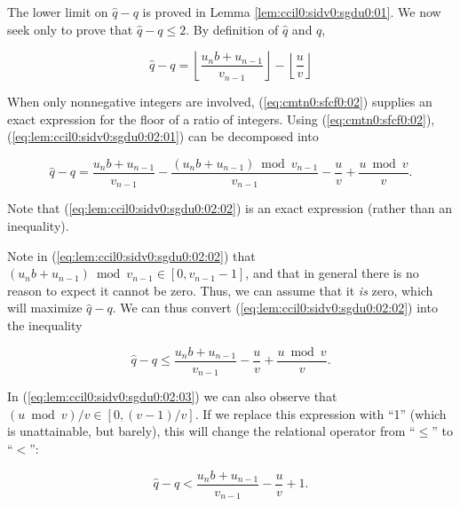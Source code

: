 \begin{vworklemmaproof}
The lower limit on $\hat{q} - q$ is proved in Lemma \ref{lem:ccil0:sidv0:sgdu0:01}.
We now seek only to prove that $\hat{q} - q \leq 2$.
By definition of $\hat{q}$ and $q$, 

\begin{equation}
\label{eq:lem:ccil0:sidv0:sgdu0:02:01}
\hat{q} - q  =    \left\lfloor {\frac{u_n b + u_{n-1}}{v_{n-1}}} \right\rfloor 
                  - \left\lfloor {\frac{u}{v}} \right\rfloor 
\end{equation}

When only nonnegative integers are involved, 
(\cmtnzeroxrefhyphen\ref{eq:cmtn0:sfcf0:02}) 
supplies an exact expression for the floor of a 
ratio of integers.  Using (\cmtnzeroxrefhyphen\ref{eq:cmtn0:sfcf0:02}),
(\ref{eq:lem:ccil0:sidv0:sgdu0:02:01}) can be decomposed into

\begin{equation}
\label{eq:lem:ccil0:sidv0:sgdu0:02:02}
\hat{q} - q  =    \frac{u_n b + u_{n-1}}{v_{n-1}}
                - \frac{(u_n b + u_{n-1}) \bmod v_{n-1}}{v_{n-1}}
                - \frac{u}{v}
                + \frac{u \bmod v}{v} . 
\end{equation}

\noindent{}Note that (\ref{eq:lem:ccil0:sidv0:sgdu0:02:02}) is an exact 
expression (rather than an
inequality).

Note in (\ref{eq:lem:ccil0:sidv0:sgdu0:02:02}) that
$(u_n b + u_{n-1}) \bmod v_{n-1} \in [0, v_{n-1}-1]$, and that in general
there is no reason to expect it cannot be zero.  Thus, we can assume that
it \emph{is} zero, which will maximize $\hat{q}-q$.  We can thus convert
(\ref{eq:lem:ccil0:sidv0:sgdu0:02:02}) into the inequality

\begin{equation}
\label{eq:lem:ccil0:sidv0:sgdu0:02:03}
\hat{q} - q  \leq \frac{u_n b + u_{n-1}}{v_{n-1}}
                - \frac{u}{v}
                + \frac{u \bmod v}{v} . 
\end{equation}

In (\ref{eq:lem:ccil0:sidv0:sgdu0:02:03}) we can also observe that
$(u \bmod v)/v \in [0, (v-1)/v]$.  If we replace this expression with 
``1'' (which is unattainable, but barely), this will change the relational
operator from ``$\leq$'' to ``$<$'':

\begin{equation}
\label{eq:lem:ccil0:sidv0:sgdu0:02:04}
\hat{q} - q  <    \frac{u_n b + u_{n-1}}{v_{n-1}}
                - \frac{u}{v}
                + 1 . 
\end{equation}


\end{vworklemmaproof}
